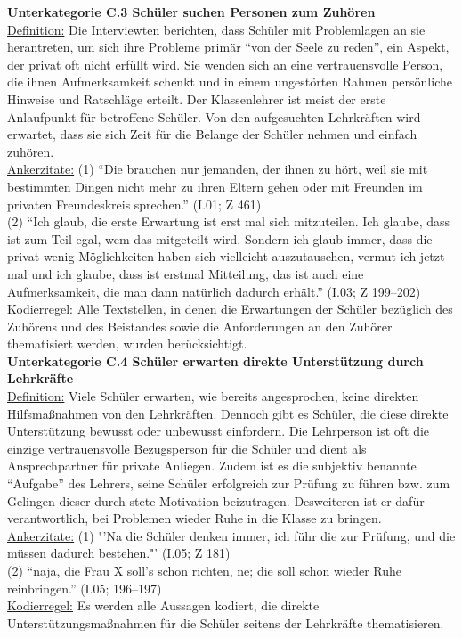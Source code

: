 \noindent
\textbf{Unterkategorie C.3 Schüler suchen Personen zum Zuhören}\\
\underline{Definition:} Die Interviewten berichten, dass Schüler mit Problemlagen an sie herantreten, um sich ihre Probleme primär "`von der Seele zu reden"', ein Aspekt, der privat oft nicht erfüllt wird. Sie wenden sich an eine vertrauensvolle Person, die ihnen Aufmerksamkeit schenkt und in einem ungestörten Rahmen persönliche Hinweise und Ratschläge erteilt. Der Klassenlehrer ist meist der erste Anlaufpunkt für betroffene Schüler. Von den aufgesuchten Lehrkräften wird erwartet, dass sie sich Zeit für die Belange der Schüler nehmen und einfach zuhören.\\
\underline{Ankerzitate:} (1) "`Die brauchen nur jemanden, der ihnen zu hört, weil sie mit bestimmten Dingen nicht mehr zu ihren Eltern gehen oder mit Freunden im privaten Freundeskreis sprechen."' (I.01; Z 461)\\ (2) "`Ich glaub, die erste Erwartung ist erst mal sich mitzuteilen. Ich glaube, dass ist zum Teil egal, wem das mitgeteilt wird. Sondern ich glaub immer, dass die privat wenig Möglichkeiten haben sich vielleicht auszutauschen, vermut ich jetzt mal und ich glaube, dass ist erstmal Mitteilung, das ist auch eine Aufmerksamkeit, die man dann natürlich dadurch erhält."' (I.03; Z 199--202)\\
\underline{Kodierregel:} Alle Textstellen, in denen die Erwartungen der Schüler bezüglich des Zuhörens und des Beistandes sowie die Anforderungen an den Zuhörer thematisiert werden, wurden berücksichtigt.\\

\noindent
\textbf{Unterkategorie C.4 Schüler erwarten direkte Unterstützung durch Lehrkräfte}\\
\underline{Definition:} Viele Schüler erwarten, wie bereits angesprochen, keine direkten Hilfsmaßnahmen von den Lehrkräften. Dennoch gibt es Schüler, die diese direkte Unterstützung bewusst oder unbewusst einfordern. Die Lehrperson ist oft die einzige vertrauensvolle Bezugsperson für die Schüler und dient als Ansprechpartner für private Anliegen. Zudem ist es die subjektiv benannte "`Aufgabe"' des Lehrers, seine Schüler erfolgreich zur Prüfung zu führen bzw. zum Gelingen dieser durch stete Motivation beizutragen. Desweiteren ist er dafür verantwortlich, bei Problemen wieder Ruhe in die Klasse zu bringen.\\
\underline{Ankerzitate:} (1) "'Na die Schüler denken immer, ich führ die zur Prüfung, und die müssen dadurch bestehen."' (I.05; Z 181)\\ (2) "`naja, die Frau X soll's schon richten, ne; die soll schon wieder Ruhe reinbringen."' (I.05; 196--197)\\
\underline{Kodierregel:} Es werden alle Aussagen kodiert, die direkte Unterstützungsmaßnahmen für die Schüler seitens der Lehrkräfte thematisieren.\\

